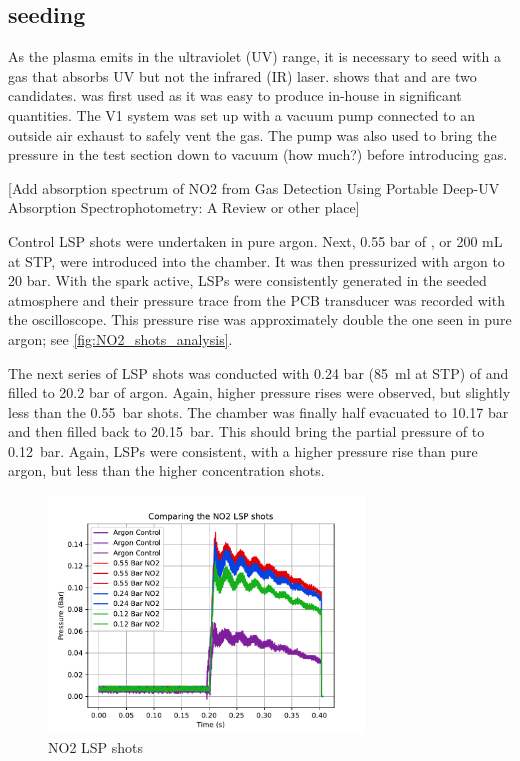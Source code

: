         \subsection{ seeding}
            
            As the plasma emits in the ultraviolet (UV) range, it is necessary to seed with a gas that absorbs UV but not the infrared (IR) laser. \textcite{khanGasDetectionUsing2019} shows that  and  are two candidates.  was first used as it was easy to produce in-house in significant quantities. The V1 system was set up with a vacuum pump connected to an outside air exhaust to safely vent the  gas. The pump was also used to bring the pressure in the test section down to vacuum (how much?) before introducing gas.

            [Add absorption spectrum of NO2 from Gas Detection Using Portable Deep-UV Absorption Spectrophotometry: A Review or other place]

            Control LSP shots were undertaken in pure argon. Next, 0.55 bar of , or 200 mL at STP, were introduced into the chamber. It was then pressurized with argon to 20 bar. With the spark active, LSPs were consistently generated in the seeded atmosphere and their pressure trace from the PCB transducer was recorded with the oscilloscope. This pressure rise was approximately double the one seen in pure argon; see \autoref{fig:NO2_shots_analysis}.

            The next series of LSP shots was conducted with 0.24 bar (\qty{85}{ml} at STP) of  and filled to 20.2 bar of argon. Again, higher pressure rises were observed, but slightly less than the \qty{0.55}{bar} shots. The chamber was finally half evacuated to 10.17 bar and then filled back to \qty{20.15}{bar}. This should bring the partial pressure of  to \qty{0.12}{bar}. Again, LSPs were consistent, with a higher pressure rise than pure argon, but less than the higher concentration  shots.

            \begin{figure}[h]
                \centering
                \includegraphics[width=0.75\textwidth]{assets/5 results/NO2_shots_analysis.pdf}
                \caption{NO2 LSP shots}
                \label{fig:NO2_shots_analysis}
            \end{figure}

